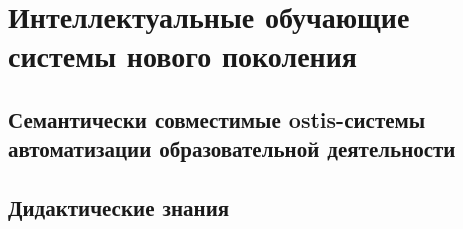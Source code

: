 \chapter{Интеллектуальные обучающие системы нового поколения}
\label{chapter_learning_systems}


\section{Семантически совместимые ostis-системы автоматизации образовательной деятельности}
\section{Дидактические знания}

%